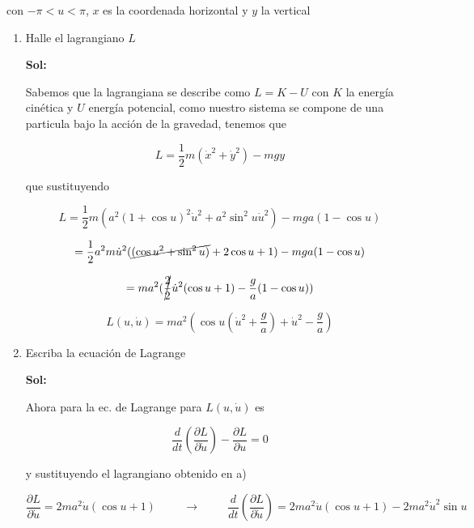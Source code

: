 \documentclass[12pt,a4paper]{article}
\begin{document}
\begin{enumerate}
con $-\pi < u < \pi$, $x$ es la coordenada horizontal y $y$ la vertical

\begin{enumerate}
    \item Halle el lagrangiano $L$
    
    \textbf{Sol:}
    
    Sabemos que la lagrangiana se describe como $L = K - U$ con $K$ la energía cinética y $U$ energía potencial, como nuestro sistema se compone de una particula bajo la acción de la gravedad, tenemos que 
    
    \begin{equation*}
        L = \frac{1}{2}m (\dot{x}^2 + \dot{y}^2) - mgy
    \end{equation*}
    
    que sustituyendo
    
    \begin{equation*}
        L = \frac{1}{2}m (a^2(1+\cos{u})^2\dot{u}^2 + a^2 \sin^2{u} \dot{u}^2) - mga (1-\cos{u})
    \end{equation*}
    
    \begin{equation*}
        = \frac{1}{2}a^2m \dot{u}^2 (\cancel{(\cos{u}^2 + \sin^2{u})} +2\cos{u} +1  ) - mga (1-\cos{u})
    \end{equation*}
    
    \begin{equation*}
        = ma^2(\cancel{\frac{2}{2}}  \dot{u}^2 (\cos{u} +1) - \frac{g}{a} (1- \cos{u}))
    \end{equation*}
    
    \begin{equation*}
        L (u,\dot{u}) = ma^2 (\cos{u} (\dot{u}^2 + \frac{g}{a}) + \dot{u}^2-\frac{g}{a})
    \end{equation*}
    
    \item Escriba la ecuación de Lagrange
    
    \textbf{Sol:}
    
    Ahora para la ec. de Lagrange para $L(u,\dot{u})$ es
    
    \begin{equation*}
        \frac{d}{dt} \left(\frac{\partial L}{\partial \dot{u}}\right) - \frac{\partial L}{\partial u} = 0
    \end{equation*}
    
    y sustituyendo el lagrangiano obtenido en a)
    
    \begin{equation*}
        \frac{\partial L}{\partial \dot{u}} = 2ma^2\dot{u} (\cos{u} + 1)  \hspace{1cm} \rightarrow \hspace{1cm} \frac{d}{dt}\left(\frac{\partial L}{\partial \dot{u}}\right) = 2ma^2\ddot{u} (\cos{u} + 1) - 2ma^2 \dot{u}^2 \sin{u} 
    \end{equation*}
    

\end{enumerate}
\end{enumerate}
\end{document}
